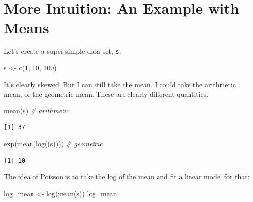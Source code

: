 \documentclass[
  letterpaper,
  DIV=11,
  numbers=noendperiod]{scrreprt}
\newenvironment{Shaded}{\begin{snugshade}}{\end{snugshade}}
\newcommand{\CommentTok}[1]{\textcolor[rgb]{0.38,0.63,0.69}{\textit{#1}}}
\newcommand{\DecValTok}[1]{\textcolor[rgb]{0.25,0.63,0.44}{#1}}
\newcommand{\FunctionTok}[1]{\textcolor[rgb]{0.02,0.16,0.49}{#1}}
\newcommand{\NormalTok}[1]{\textcolor[rgb]{0.00,0.44,0.13}{#1}}
\newcommand{\OtherTok}[1]{\textcolor[rgb]{0.00,0.44,0.13}{#1}}
\begin{document}
\hypertarget{more-intuition-an-example-with-means}{%
\section{More Intuition: An Example with
Means}\label{more-intuition-an-example-with-means}}

Let's create a super simple data set, \texttt{s}.

\begin{Shaded}
\begin{Highlighting}[]
\NormalTok{s }\OtherTok{\textless{}{-}} \FunctionTok{c}\NormalTok{(}\DecValTok{1}\NormalTok{, }\DecValTok{10}\NormalTok{, }\DecValTok{100}\NormalTok{)}
\end{Highlighting}
\end{Shaded}

It's clearly skewed. But I can still take the mean. I could take the
arithmetic mean, or the geometric mean. These are clearly different
quantities.

\begin{Shaded}
\begin{Highlighting}[]
\FunctionTok{mean}\NormalTok{(s) }\CommentTok{\# arithmetic}
\end{Highlighting}
\end{Shaded}

\begin{verbatim}
[1] 37
\end{verbatim}

\begin{Shaded}
\begin{Highlighting}[]
\FunctionTok{exp}\NormalTok{(}\FunctionTok{mean}\NormalTok{(}\FunctionTok{log}\NormalTok{((s)))) }\CommentTok{\# geometric}
\end{Highlighting}
\end{Shaded}

\begin{verbatim}
[1] 10
\end{verbatim}

The idea of Poisson is to take the log of the mean and fit a linear
model for that:

\begin{Shaded}
\begin{Highlighting}[]
\NormalTok{log\_mean }\OtherTok{\textless{}{-}} \FunctionTok{log}\NormalTok{(}\FunctionTok{mean}\NormalTok{(s))}
\NormalTok{log\_mean}
\end{Highlighting}
\end{Shaded}
\end{document}
